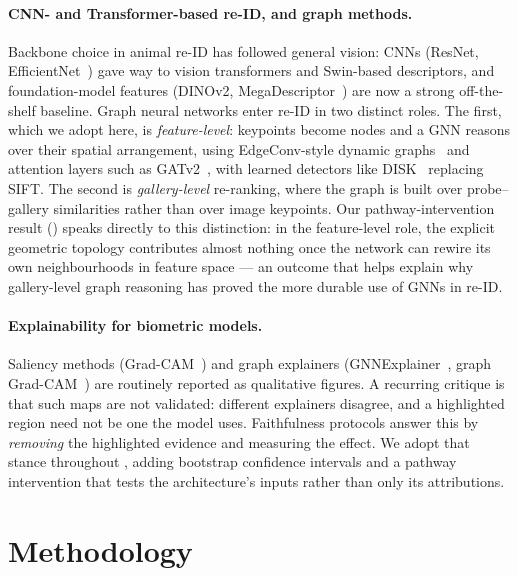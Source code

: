\documentclass[11pt]{article}
\begin{document}
\paragraph{CNN- and Transformer-based re-ID, and graph methods.} Backbone choice in animal
re-ID has followed general vision: CNNs (ResNet, EfficientNet~\cite{efficientnet}) gave way to
vision transformers and Swin-based descriptors, and foundation-model features (DINOv2,
MegaDescriptor~\cite{megadesc}) are now a strong off-the-shelf baseline. Graph neural networks
enter re-ID in two distinct roles. The first, which we adopt here, is \emph{feature-level}:
keypoints become nodes and a GNN reasons over their spatial arrangement, using EdgeConv-style
dynamic graphs~\cite{edgeconv} and attention layers such as GATv2~\cite{gatv2}, with learned
detectors like DISK~\cite{disk} replacing SIFT. The second is \emph{gallery-level}
re-ranking, where the graph is built over probe--gallery similarities rather than over image
keypoints. Our pathway-intervention result () speaks directly to this
distinction: in the feature-level role, the explicit geometric topology contributes almost
nothing once the network can rewire its own neighbourhoods in feature space --- an outcome
that helps explain why gallery-level graph reasoning has proved the more durable use of GNNs
in re-ID.

\paragraph{Explainability for biometric models.} Saliency methods (Grad-CAM~\cite{gradcam})
and graph explainers (GNNExplainer~\cite{gnnexplainer}, graph Grad-CAM~\cite{popeexpl}) are
routinely reported as qualitative figures. A recurring critique is that such maps are not
validated: different explainers disagree, and a highlighted region need not be one the model
uses. Faithfulness protocols answer this by \emph{removing} the highlighted evidence and
measuring the effect. We adopt that stance throughout , adding bootstrap
confidence intervals and a pathway intervention that tests the architecture's inputs rather
than only its attributions.

\section{Methodology}
\end{document}
